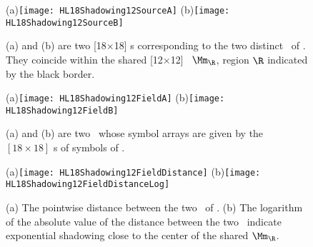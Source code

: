 \begin{description}
\begin{figure}
  \centering
(a)\texttt{[image: HL18Shadowing12SourceA]}
(b)\texttt{[image: HL18Shadowing12SourceB]}
  \caption{\label{fig:HL18Shadowing12Source}
(a) and (b) are two {\admissible} [18$\times$18] \brick s corresponding to the two
distinct \twots\ of . They coincide within the shared
[12$\times$12] \brick\  $\Mm_\R$, region $\R$ indicated by the black border.
}
\end{figure}

\begin{figure}
  \centering
(a)\texttt{[image: HL18Shadowing12FieldA]}
(b)\texttt{[image: HL18Shadowing12FieldB]}
  \caption{\label{fig:HL18Shadowing12Field}
(a) and (b) are two \twots\ whose symbol arrays are given by the $[18\times18]$ \brick s of symbols of .
}
\end{figure}

\begin{figure}
  \centering
(a)\texttt{[image: HL18Shadowing12FieldDistance]}
(b)\texttt{[image: HL18Shadowing12FieldDistanceLog]}
  \caption{\label{fig:HL18Shadowing12Distance}
(a) The pointwise distance between the two \twots\ of .
(b) The logarithm of the absolute value of the distance between the two \twots\ indicate exponential shadowing close to the center of the shared $\Mm_\R$.
}
\end{figure}

\end{description}
